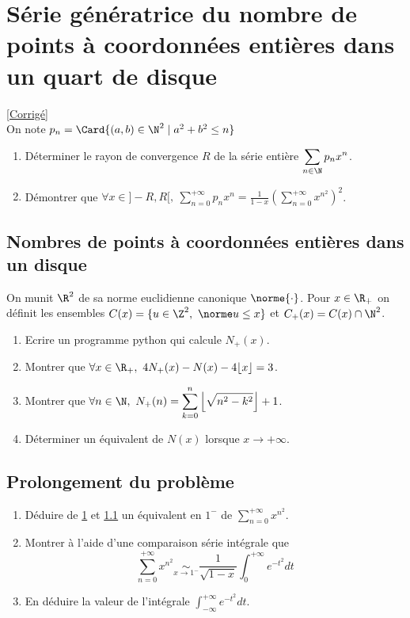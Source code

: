 \documentclass{book}
\begin{document}
\section{Série génératrice du nombre de points à coordonnées entières dans un quart de disque}
\label{Série génératrice du nombre de points à coordonnées entières dans un quart de disque}
\textcolor{blue}{\hyperref[sec:serie-generatrice-du-nombre-de-points-a-coordonnees-entieres-dans-un-quart-de-disque]{[Corrigé]}}\\
On note $p_n=\Card\{(a,b)\in \N^2 \mid a^2+b^2\leq n\}$
\begin{enumerate}
	\item Déterminer le rayon de convergence $R$ de la série entière $\displaystyle\sum_{n\in \N}p_nx^n$.
	\item Démontrer que $\forall x\in ]-R,R[,\ \displaystyle\sum_{n=0}^{+\infty}p_nx^n=\frac{1}{1-x}\left(\sum_{n=0}^{+\infty}x^{n^2}\right)^2$.
\end{enumerate}

\subsection{Nombres de points à coordonnées entières dans un disque}
\label{Nombre de points à coordonnées entières dans un disque}
On munit $\R^2$ de sa norme euclidienne canonique $\norme{\cdot}$. Pour $x\in \R_+$ on définit les ensembles $C(x)=\{u\in \Z^2,\ \norme u\leq x\}$ et $C_+(x)=C(x)\cap\N^2$.
\begin{enumerate}
	\item Ecrire un programme python qui calcule $N_+(x)$.
	\item Montrer que $\forall x\in \R_+,\ 4N_+(x)-N(x)-4\lfloor x\rfloor=3$.
	\item Montrer que $\forall n\in \N,\ N_+(n)=\displaystyle\sum_{k=0}^n\left\lfloor\sqrt{n^2-k^2}\right\rfloor+1$.
	\item Déterminer un équivalent de $N(x)$ lorsque $x\to+\infty$.
\end{enumerate}

\subsection{Prolongement du problème}
\label{Prolongement du problème}
\begin{enumerate}
	\item Déduire de \ref{Série génératrice du nombre de points à coordonnées entières dans un quart de disque} et \ref{Nombre de points à coordonnées entières dans un disque} un équivalent en $1^-$ de $\displaystyle\sum_{n=0}^{+\infty}x^{n^2}$.
	\item Montrer à l'aide d'une comparaison série intégrale que $$\displaystyle\sum_{n=0}^{+\infty}x^{n^2}\underset{x\to 1^-}{\sim}\frac{1}{\sqrt{1-x}}\int_0^{+\infty}e^{-t^2}dt$$
	\item En déduire la valeur de l'intégrale $\displaystyle\int_{-\infty}^{+\infty}e^{-t^2}dt$.
\end{enumerate} 
\end{document}
